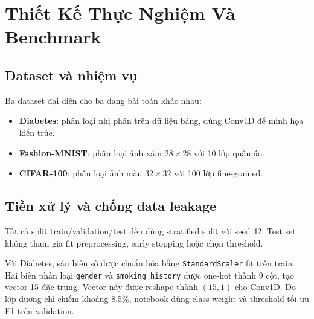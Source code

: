 \documentclass[12pt,a4paper]{report}
\begin{document}
\chapter{Thiết Kế Thực Nghiệm Và Benchmark}

\section{Dataset và nhiệm vụ}
Ba dataset đại diện cho ba dạng bài toán khác nhau:
\begin{itemize}
    \item \textbf{Diabetes}: phân loại nhị phân trên dữ liệu bảng, dùng Conv1D để minh họa kiến trúc.
    \item \textbf{Fashion-MNIST}: phân loại ảnh xám $28\times28$ với 10 lớp quần áo.
    \item \textbf{CIFAR-100}: phân loại ảnh màu $32\times32$ với 100 lớp fine-grained.
\end{itemize}

\begin{table}[H]
\centering
\caption{Tổng quan dữ liệu Assignment 05}
\label{tab:dataset_overview}
\end{table}

\section{Tiền xử lý và chống data leakage}
Tất cả split train/validation/test đều dùng stratified split với seed 42.
Test set không tham gia fit preprocessing, early stopping hoặc chọn threshold.

Với Diabetes, sáu biến số được chuẩn hóa bằng \texttt{StandardScaler} fit trên train.
Hai biến phân loại \texttt{gender} và \texttt{smoking\_history} được one-hot thành 9 cột, tạo vector 15 đặc trưng.
Vector này được reshape thành $(15,1)$ cho Conv1D.
Do lớp dương chỉ chiếm khoảng 8.5\%, notebook dùng class weight và threshold tối ưu F1 trên validation.
\end{document}
